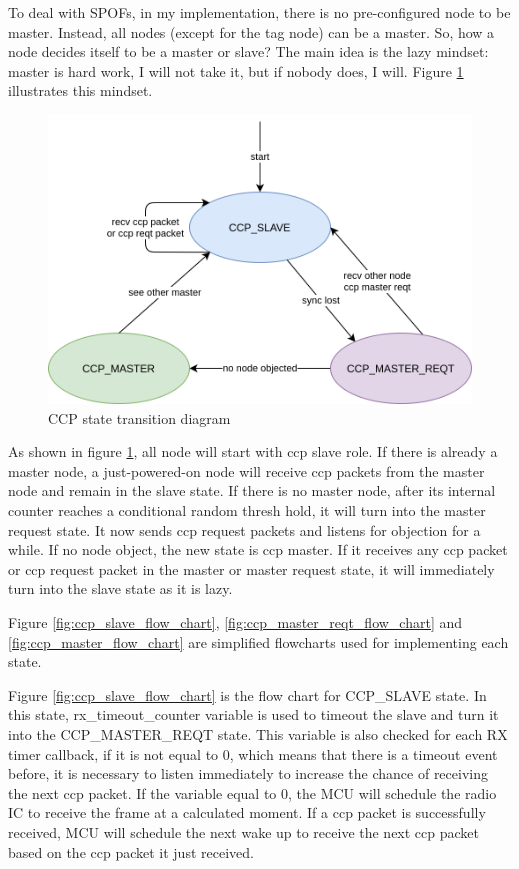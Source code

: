 \documentclass[\main/main.tex]{subfiles}
\begin{document}
To deal with SPOFs, in my implementation, there is no pre-configured node to be master. Instead, all nodes (except for the tag node) can be a master. So, how a node decides itself to be a master or slave? The main idea is the lazy mindset: master is hard work, I will not take it, but if nobody does, I will. Figure \ref{fig:CCP_state_diagram} illustrates this mindset.

\begin{figure}[H]
    \begin{center}
        \includegraphics[scale=0.35]{ccp_state_diagram.png}
    \end{center}
    \caption{CCP state transition diagram}
    \label{fig:CCP_state_diagram}
\end{figure}

As shown in figure \ref{fig:CCP_state_diagram}, all node will start with ccp slave role. If there is already a master node, a just-powered-on node will receive ccp packets from the master node and remain in the slave state. If there is no master node, after its internal counter reaches a conditional random thresh hold, it will turn into the master request state. It now sends ccp request packets and listens for objection for a while. If no node object, the new state is ccp master. If it receives any ccp packet or ccp request packet in the master or master request state, it will immediately turn into the slave state as it is lazy.

Figure \ref{fig:ccp_slave_flow_chart}, \ref{fig:ccp_master_reqt_flow_chart} and \ref{fig:ccp_master_flow_chart} are simplified flowcharts used for implementing each state.

Figure \ref{fig:ccp_slave_flow_chart} is the flow chart for CCP\_SLAVE state. In this state, rx\_timeout\_counter variable is used to timeout the slave and turn it into the CCP\_MASTER\_REQT state.
This variable is also checked for each RX timer callback, if it is not equal to 0, which means that there is a timeout event before, it is necessary to listen immediately to increase the chance of receiving the next ccp packet. If the variable equal to 0, the MCU will schedule the radio IC to receive the frame at a calculated moment. If a ccp packet is successfully received, MCU will schedule the next wake up to receive the next ccp packet based on the ccp packet it just received. 
\end{document}

